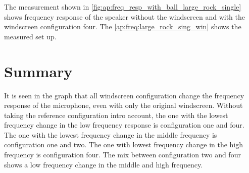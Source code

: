 The measurement shown in \autoref{fig:ap:freq_resp_with_ball_large_rock_single} shows frequency response of the speaker without the windscreen and with the windscreen configuration four. The \autoref{ap:freq:large_rock_sing_win} shows the measured set up. 


\section*{Summary}

It is seen in the graph that all windscreen configuration change the frequency response of the microphone, even with only the original windscreen. Without taking the reference configuration intro account, the one with the lowest frequency change in the low frequency response is configuration one and four. The one with the lowest frequency change in the middle frequency is configuration one and two. The one with lowest frequency change in the high frequency is configuration four. The mix between configuration two and four shows a low frequency change in the middle and high frequency.  
